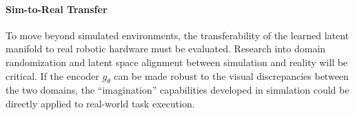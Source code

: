 \paragraph{Sim-to-Real Transfer}
To move beyond simulated environments, the transferability of the learned latent manifold to real robotic hardware must be evaluated. Research into domain randomization and latent space alignment between simulation and reality will be critical. If the encoder $g_\theta$ can be made robust to the visual discrepancies between the two domains, the ``imagination'' capabilities developed in simulation could be directly applied to real-world task execution.



